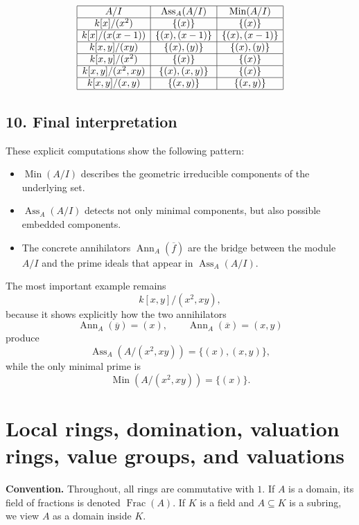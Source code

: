 \documentclass[12pt,a4paper]{article}
\theoremstyle{notespace}
\DeclareMathOperator{\Ass}{Ass}
\DeclareMathOperator{\Ann}{Ann}
\DeclareMathOperator{\Min}{Min}
\DeclareMathOperator{\Frac}{Frac}
\begin{document}
\[
\begin{array}{|c|c|c|}
	\hline
	A/I & \Ass_A(A/I) & \Min(A/I) \\
	\hline
	k[x]/(x^2) & \{(x)\} & \{(x)\} \\
	\hline
	k[x]/(x(x-1)) & \{(x),(x-1)\} & \{(x),(x-1)\} \\
	\hline
	k[x,y]/(xy) & \{(x),(y)\} & \{(x),(y)\} \\
	\hline
	k[x,y]/(x^2) & \{(x)\} & \{(x)\} \\
	\hline
	k[x,y]/(x^2,xy) & \{(x),(x,y)\} & \{(x)\} \\
	\hline
	k[x,y]/(x,y) & \{(x,y)\} & \{(x,y)\} \\
	\hline
\end{array}
\]

\subsection*{10. Final interpretation}

These explicit computations show the following pattern:

\begin{itemize}
	\item \(\Min(A/I)\) describes the geometric irreducible components of the underlying set.
	\item \(\Ass_A(A/I)\) detects not only minimal components, but also possible embedded components.
	\item The concrete annihilators \(\Ann_A(\overline f)\) are the bridge between the module \(A/I\) and the prime ideals that appear in \(\Ass_A(A/I)\).
\end{itemize}

The most important example remains
\[
k[x,y]/(x^2,xy),
\]
because it shows explicitly how the two annihilators
\[
\Ann_A(\overline y)=(x),
\qquad
\Ann_A(\overline x)=(x,y)
\]
produce
\[
\Ass_A(A/(x^2,xy))=\{(x),(x,y)\},
\]
while the only minimal prime is
\[
\Min(A/(x^2,xy))=\{(x)\}.
\]

\section*{Local rings, domination, valuation rings, value groups, and valuations}

\textbf{Convention.}
Throughout, all rings are commutative with \(1\). If \(A\) is a domain, its field of fractions is denoted \(\Frac(A)\). If \(K\) is a field and \(A\subseteq K\) is a subring, we view \(A\) as a domain inside \(K\).
\end{document}
